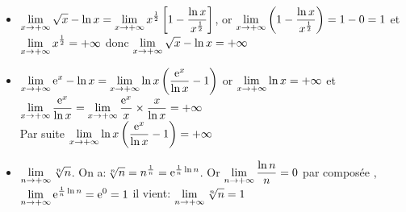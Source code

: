 \begin{example}

\begin{itemize}
\item $\displaystyle \lim_{x \to +\infty} \sqrt{x}-\ln x =\displaystyle\lim_{x \to +\infty}x^{\frac{1}{2}}\left[ 1-\dfrac{\ln x}{x^{\frac{1}{2}}} \right]$,   or $\displaystyle \displaystyle\lim_{x \to +\infty}\left(1-\dfrac{\ln x}{x^{\frac{1}{2}}}\right) =1-0=1 $     et $ \displaystyle\lim_{x \to +\infty}x^{\frac{1}{2}}=+\infty $     donc $\displaystyle\lim_{x \to +\infty} \sqrt{x}-\ln x=+\infty  $  
\item $\displaystyle\lim_{x \to +\infty}\mathrm{e}^{x} -\ln x =\displaystyle\lim_{x \to +\infty}\ln x\left(\dfrac{\mathrm{e}^{x}}{\ln x} -1\right)$     or $\displaystyle \lim_{x \to +\infty}\ln x=+\infty $    et $\displaystyle \lim_{x \to +\infty}\dfrac{\mathrm{e}^{x}}{\ln x}= \displaystyle \lim_{x \to +\infty}\dfrac{\mathrm{e}^{x}}{ x}\times\frac{x}{\ln x} =+\infty$ \\ Par suite $\displaystyle \lim_{x \to +\infty}\ln x\left(\dfrac{\mathrm{e}^{x}}{\ln x} -1\right)=+\infty $ 
\item $\displaystyle \lim_{n \to +\infty} \sqrt[n]{n} $. \;    On a:\;$\sqrt[n]{n}=n^{\frac{1}{n}}  =\mathrm{e}^{\frac{1}{n}\ln n} $.\;   Or $ \displaystyle\lim_{n \to +\infty}\dfrac{\ln n}{n} =0$\;     par  composée , $ \displaystyle \lim_{n \to +\infty} \mathrm{e}^{\frac{1}{n}\ln n}=\mathrm{e}^{0}=1$   il vient: $ \displaystyle\lim_{n \to +\infty} \sqrt[n]{n}=1 $  

\end{itemize}

\end{example}

